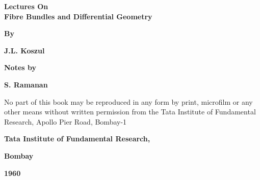 \thispagestyle{empty}
\begin{center}
{\Large\bf Lectures On}\\[5pt]
{\Large\bf Fibre Bundles and Differential Geometry}
\vskip 1cm

{\bf  By}
\medskip

{\large\bf  J.L. Koszul}
\vfill

{\bf  Notes by}
\medskip

{\large\bf  S. Ramanan}
\vfill


\parbox{0.7\textwidth}{No part of this book may be reproduced 
in any form by print, microfilm or any other means without 
written permission from the  Tata Institute of Fundamental 
Research, Apollo Pier Road, Bombay-1}
\vfill

{\bf  Tata Institute of Fundamental Research,}

{\bf Bombay}

{\bf  1960}
\end{center}
